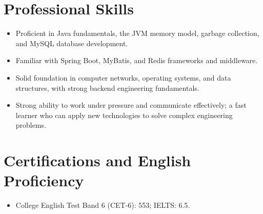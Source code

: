 \documentclass[10pt,a4paper]{article}
\begin{document}
\section{Professional Skills}
\begin{itemize}
  \item Proficient in Java fundamentals, the JVM memory model, garbage collection, and MySQL database development.
  \item Familiar with Spring Boot, MyBatis, and Redis frameworks and middleware.
  \item Solid foundation in computer networks, operating systems, and data structures, with strong backend engineering fundamentals.
  \item Strong ability to work under pressure and communicate effectively; a fast learner who can apply new technologies to solve complex engineering problems.
\end{itemize}

\section{Certifications and English Proficiency}
\begin{itemize}
  \item College English Test Band 6 (CET-6): 553; IELTS: 6.5.
\end{itemize}
\end{document}

